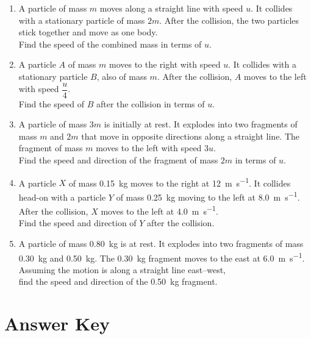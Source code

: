 \documentclass[11pt,a4paper]{article}
\begin{document}
\begin{enumerate}
    \item A particle of mass $m$ moves along a straight line with speed $u$. It collides with a stationary particle of mass $2m$. After the collision, the two particles stick together and move as one body. \\
    Find the speed of the combined mass in terms of $u$.

    \item A particle $A$ of mass $m$ moves to the right with speed $u$. It collides with a stationary particle $B$, also of mass $m$. After the collision, $A$ moves to the left with speed $\dfrac{u}{4}$. \\
    Find the speed of $B$ after the collision in terms of $u$.

    \item A particle of mass $3m$ is initially at rest. It explodes into two fragments of mass $m$ and $2m$ that move in opposite directions along a straight line. The fragment of mass $m$ moves to the left with speed $3u$. \\
    Find the speed and direction of the fragment of mass $2m$ in terms of $u$.

    \item A particle $X$ of mass \SI{0.15}{\kilogram} moves to the right at \SI{12}{\meter\per\second}. It collides head-on with a particle $Y$ of mass \SI{0.25}{\kilogram} moving to the left at \SI{8.0}{\meter\per\second}. After the collision, $X$ moves to the left at \SI{4.0}{\meter\per\second}. \\
    Find the speed and direction of $Y$ after the collision.

    \item A particle of mass \SI{0.80}{\kilogram} is at rest. It explodes into two fragments of mass \SI{0.30}{\kilogram} and \SI{0.50}{\kilogram}. The \SI{0.30}{\kilogram} fragment moves to the east at \SI{6.0}{\meter\per\second}. Assuming the motion is along a straight line east--west, \\
    find the speed and direction of the \SI{0.50}{\kilogram} fragment.
\end{enumerate}

\newpage

\section*{Answer Key}
\end{document}
